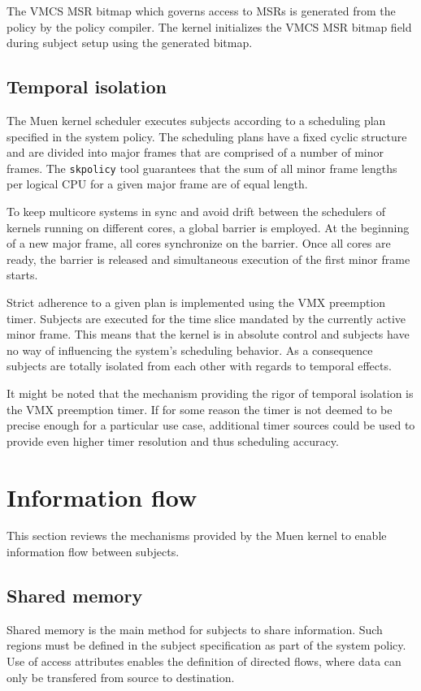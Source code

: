 The VMCS MSR bitmap which governs access to MSRs is generated from the policy by
the policy compiler. The kernel initializes the VMCS MSR bitmap field during
subject setup using the generated bitmap.

\subsection{Temporal isolation}\label{subsec:temp-isolation}
The Muen kernel scheduler executes subjects according to a scheduling plan
specified in the system policy. The scheduling plans have a fixed cyclic
structure and are divided into major frames that are comprised of a number of
minor frames. The \texttt{skpolicy} tool guarantees that the sum of all minor
frame lengths per logical CPU for a given major frame are of equal length.

To keep multicore systems in sync and avoid drift between the schedulers of
kernels running on different cores, a global barrier is employed. At the
beginning of a new major frame, all cores synchronize on the barrier. Once all
cores are ready, the barrier is released and simultaneous execution of the
first minor frame starts.

Strict adherence to a given plan is implemented using the VMX preemption timer.
Subjects are executed for the time slice mandated by the currently active minor
frame. This means that the kernel is in absolute control and subjects have no
way of influencing the system's scheduling behavior. As a consequence subjects
are totally isolated from each other with regards to temporal effects.

It might be noted that the mechanism providing the rigor of temporal isolation
is the VMX preemption timer. If for some reason the timer is not deemed to be
precise enough for a particular use case, additional timer sources could be used
to provide even higher timer resolution and thus scheduling accuracy.

\section{Information flow}\label{sec:information-flow}
This section reviews the mechanisms provided by the Muen kernel to enable
information flow between subjects.

\subsection{Shared memory}
Shared memory is the main method for subjects to share information. Such regions
must be defined in the subject specification as part of the system policy. Use of
access attributes enables the definition of directed flows, where data can only
be transfered from source to destination.

